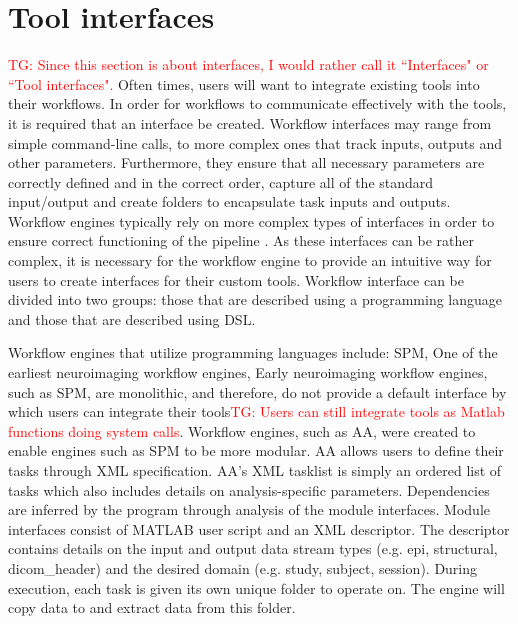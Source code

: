 \documentclass{report}
\newcommand{\tristan}[1]{\textcolor{red}{TG: #1}}
\begin{document}
        \section{Tool interfaces}\label{mod}
            \tristan{Since this section is about interfaces, I would
            rather call it ``Interfaces" or ``Tool interfaces".}
            Often times, users will want to integrate existing tools into their 
            workflows. In order for workflows to communicate effectively with
            the tools, it is required that an interface be created. Workflow 
            interfaces may range from simple command-line calls, to more 
            complex ones that track inputs, outputs and other parameters. 
            Furthermore, they ensure
            that all necessary parameters are correctly defined and in the 
            correct order,  capture all of the 
            standard input/output and create folders to encapsulate task inputs
            and outputs. Workflow engines typically rely on more complex types 
            of interfaces in order to ensure correct functioning of the pipeline
            . As these interfaces can be rather complex, it is necessary for the 
            workflow engine to provide an intuitive way for users to create 
            interfaces for their custom tools. Workflow interface can be 
            divided into two groups: those that are described using a 
            programming language and those that are described using DSL.


            Workflow engines that utilize programming languages include: SPM,
            One of the earliest neuroimaging workflow engines, 
            Early neuroimaging workflow engines, such as SPM, are monolithic, 
            and therefore, do not provide a default interface by which users 
            can integrate their tools\tristan{Users can still integrate tools as Matlab functions
            doing system calls}. Workflow engines, such as AA, were 
            created to enable engines such as SPM to be more modular. AA 
            allows users to define their tasks through XML specification. AA's 
            XML tasklist is simply an ordered list of tasks which also includes
            details on analysis-specific parameters. Dependencies are
            inferred by the program through analysis of the module interfaces.
            Module interfaces consist of MATLAB user script and an XML 
            descriptor. The descriptor contains details on the input and output
            data stream types (e.g. epi, structural, dicom\_header) 
            and the desired domain (e.g. study, subject, session). During 
            execution, each task is given its own unique folder to operate on. 
            The engine will copy data to and extract data from this folder.
\end{document}
